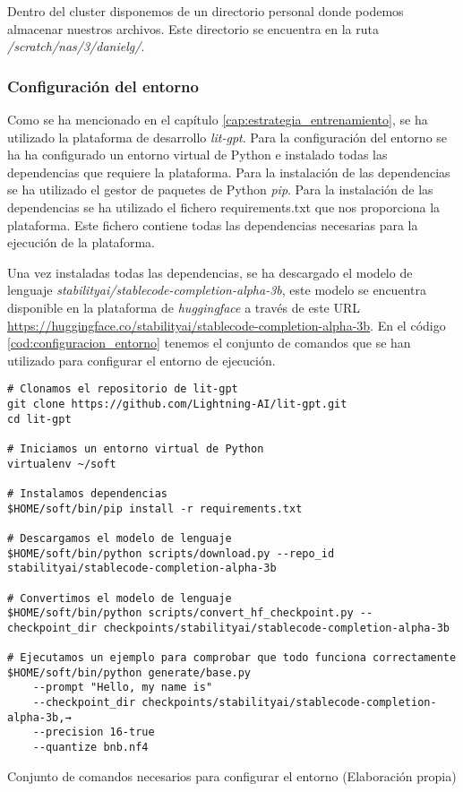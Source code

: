 Dentro del cluster disponemos de un directorio personal donde podemos almacenar nuestros
archivos. Este directorio se encuentra en la ruta \textit{/scratch/nas/3/danielg/}.

\subsubsection{Configuración del entorno}
\label{subsubsec:configuracion_entorno}


Como se ha mencionado en el capítulo \ref{cap:estrategia_entrenamiento}, se ha utilizado
la plataforma de desarrollo \textit{lit-gpt}. Para la configuración del entorno se ha
ha configurado un entorno virtual de Python e instalado todas las dependencias que requiere
la plataforma. Para la instalación de las dependencias se ha utilizado el gestor de paquetes
de Python \textit{pip}. Para la instalación de las dependencias se ha utilizado el
fichero requirements.txt que nos proporciona la plataforma. Este fichero contiene 
todas las dependencias necesarias para la ejecución de la plataforma.

Una vez instaladas todas las dependencias, se ha descargado el modelo de lenguaje \textit{stabilityai/stablecode-completion-alpha-3b},
este modelo se encuentra disponible en la plataforma de \textit{huggingface} a través de
este URL \url{https://huggingface.co/stabilityai/stablecode-completion-alpha-3b}. En el
código \ref{cod:configuracion_entorno} tenemos el conjunto de comandos que se han
utilizado para configurar el entorno de ejecución.

\begin{mycode}
    \begin{verbatim}
# Clonamos el repositorio de lit-gpt
git clone https://github.com/Lightning-AI/lit-gpt.git
cd lit-gpt

# Iniciamos un entorno virtual de Python
virtualenv ~/soft

# Instalamos dependencias
$HOME/soft/bin/pip install -r requirements.txt

# Descargamos el modelo de lenguaje
$HOME/soft/bin/python scripts/download.py --repo_id stabilityai/stablecode-completion-alpha-3b

# Convertimos el modelo de lenguaje
$HOME/soft/bin/python scripts/convert_hf_checkpoint.py --checkpoint_dir checkpoints/stabilityai/stablecode-completion-alpha-3b

# Ejecutamos un ejemplo para comprobar que todo funciona correctamente
$HOME/soft/bin/python generate/base.py
    --prompt "Hello, my name is"
    --checkpoint_dir checkpoints/stabilityai/stablecode-completion-alpha-3b,→
    --precision 16-true
    --quantize bnb.nf4
    \end{verbatim}
    \caption[Conjunto de comandos necesarios para configurar el entorno]{Conjunto de comandos necesarios para configurar el entorno (Elaboración propia)}
    \label{cod:configuracion_entorno}
\end{mycode}

